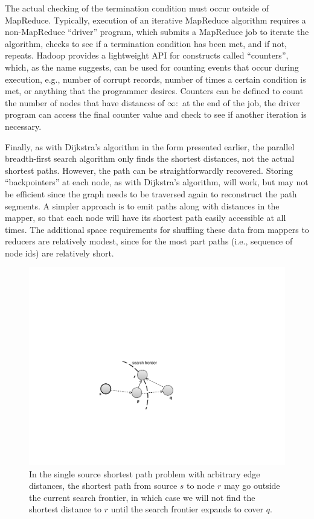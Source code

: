The actual checking of the termination condition must occur outside of
MapReduce.  Typically, execution of an iterative MapReduce algorithm
requires a non-MapReduce ``driver'' program, which submits a MapReduce
job to iterate the algorithm, checks to see if a termination condition
has been met, and if not, repeats.  Hadoop provides a lightweight API
for constructs called ``counters'', which, as the name suggests, can be
used for counting events that occur during execution, e.g., number
of corrupt records, number of times a certain condition is met, or
anything that the programmer desires.  Counters can be defined to
count the number of nodes that have distances of $\infty$:\ at the end
of the job, the driver program can access the final counter value and
check to see if another iteration is necessary.

Finally, as with Dijkstra's algorithm in the form presented earlier,
the parallel breadth-first search algorithm only finds the shortest
distances, not the actual shortest paths.  However, the path can be
straightforwardly recovered.  Storing ``backpointers'' at each node,
as with Dijkstra's algorithm, will work, but may not be efficient
since the graph needs to be traversed again to reconstruct the path
segments.  A simpler approach is to emit paths along with distances in
the mapper, so that each node will have its shortest path easily
accessible at all times.  The additional space requirements for
shuffling these data from mappers to reducers are relatively modest,
since for the most part paths (i.e., sequence of node ids) are relatively short.

\begin{figure}[t]
\begin{center}
\vspace{0.2cm}
\includegraphics[scale=0.6]{figures/fig-ch5-search-frontier.pdf}
\vspace{-0.3cm}
\end{center}
\caption{In the single source shortest path problem with arbitrary
  edge distances, the shortest path from source $s$ to node $r$ may go
  outside the current search frontier, in which case we will not find
  the shortest distance to $r$ until the search frontier expands to
  cover $q$.}
\label{figure:chapter-graphs:search-frontier}
\end{figure}

